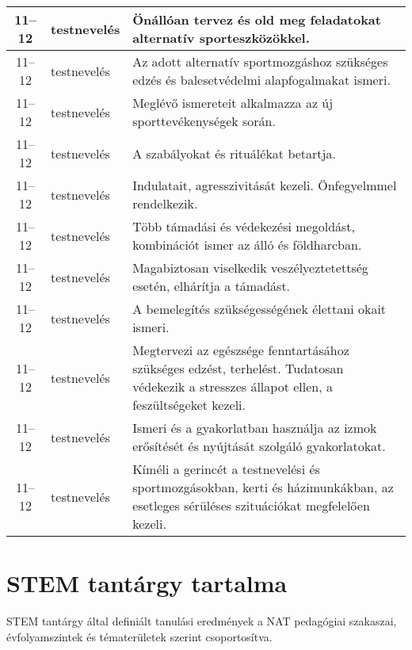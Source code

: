 \begin{small}
\begin{longtable}{c | p{2cm} |  p{11cm} }
              11--12 & testnevelés & Önállóan tervez  és old meg feladatokat alternatív sporteszközökkel. \\ \hline
              11--12 & testnevelés & Az adott alternatív sportmozgáshoz szükséges edzés és balesetvédelmi alapfogalmakat ismeri. \\ \hline
              11--12 & testnevelés & Meglévő ismereteit alkalmazza az új sporttevékenységek során. \\ \hline
              11--12 & testnevelés & A szabályokat és rituálékat betartja. \\ \hline
              11--12 & testnevelés & Indulatait, agresszivitását kezeli. Önfegyelmmel rendelkezik. \\ \hline
              11--12 & testnevelés & Több támadási és védekezési megoldást, kombinációt ismer az álló és földharcban. \\ \hline
              11--12 & testnevelés & Magabiztosan viselkedik veszélyeztetettség esetén, elhárítja a támadást. \\ \hline
              11--12 & testnevelés & A bemelegítés szükségességének élettani okait ismeri. \\ \hline
              11--12 & testnevelés & Megtervezi az egészsége fenntartásához szükséges edzést, terhelést. Tudatosan védekezik a stresszes állapot ellen, a feszültségeket kezeli. \\ \hline
              11--12 & testnevelés & Ismeri és a gyakorlatban használja az izmok erősítését és nyújtását szolgáló gyakorlatokat. \\ \hline
              11--12 & testnevelés & Kíméli a gerincét a testnevelési és sportmozgásokban, kerti és házimunkákban, az esetleges sérüléses szituációkat megfelelően kezeli. \\ \hline
      \end{longtable}
\end{small}




\section{STEM tantárgy tartalma }
STEM tantárgy által definiált tanulási eredmények a NAT pedagógiai szakaszai, évfolyamszintek és tématerületek szerint csoportosítva.

